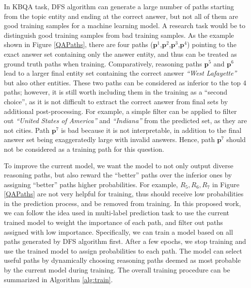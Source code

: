 In KBQA task, DFS algorithm can generate a large number of paths starting from the topic entity and ending at the correct answer, but not all of them are good training samples for a machine learning model. A research task would be to distinguish good training samples from bad training samples. As the example shown in Figure \ref{QAPaths}, there are four paths ($\mathbf{p}^1$,$\mathbf{p}^2$,$\mathbf{p}^3$,$\mathbf{p}^4$) pointing to the exact answer set containing only the answer entity, and thus can be treated as ground truth paths when training. Comparatively, reasoning paths $\mathbf{p}^5$ and $\mathbf{p}^6$ lead to a larger final entity set containing the correct answer \textit{``West Lafayette''} but also other entities. These two paths can be considered as inferior to the top 4 paths; however, it is still worth including them in the training as a ``second choice'', as it is not difficult to extract the correct answer from final sets by additional post-processing. For example, a simple filter can be applied to filter out \textit{``United States of America''} and \textit{``Indiana''} from the predicted set, as they are not cities. Path $\mathbf{p}^7$ is bad because it is not interpretable, in addition to the final answer set being exaggeratedly large with invalid answers. Hence, path $\mathbf{p}^7$ should not be considered as a training path for this question. %

To improve the current model, we want the model to not only output diverse reasoning paths, but also reward the ``better'' paths over the inferior ones by assigning ``better'' paths higher probabilities. For example, $R_5, R_6, R_7$ in Figure \ref{QAPaths} are not very helpful for training, thus should receive low probabilities in the prediction process, and be removed from training. In this proposed work, we can follow the idea used in multi-label prediction task to use the current trained model to weight the importance of each path, and filter out paths assigned with low importance. Specifically, we can train a model based on all paths generated by DFS algorithm first. After a few epochs, we stop training and use the trained model to assign probabilities to each path. The model can select useful paths by dynamically choosing reasoning paths deemed as most probable by the current model during training. The overall training procedure can be summarized in Algorithm \ref{alg:train}.


